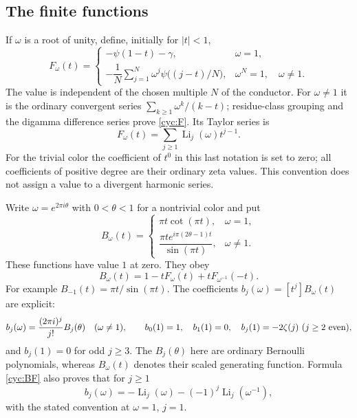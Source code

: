 \documentclass[11pt,a4paper]{article}
\numberwithin{equation}{section}
\theoremstyle{definition}
\theoremstyle{remark}
\begin{document}
\subsection{The finite functions}

If $\omega$ is a root of unity, define, initially for $|t|<1$,
\begin{equation}\label{cyc:F}
 F_\omega(t)=\begin{cases}
 -\psi(1-t)-\gamma,&\omega=1,\\[2pt]
 -\dfrac1N\displaystyle\sum_{j=1}^N\omega^j
                  \psi\bigl((j-t)/N\bigr),
       &\omega^N=1,\quad\omega\ne1.
 \end{cases}
\end{equation}
The value is independent of the chosen multiple $N$ of the conductor.
For $\omega\ne1$ it is the ordinary convergent series
$\sum_{k\ge1}\omega^k/(k-t)$; residue-class grouping and the digamma
difference series prove \eqref{cyc:F}.  Its Taylor series is
\[
 F_\omega(t)=\sum_{j\ge1}\operatorname{Li}_j(\omega)t^{j-1}.
\]
For the trivial color the coefficient of $t^0$ in this last notation is
set to zero; all coefficients of positive degree are their ordinary
zeta values.  This convention does not assign a value to a divergent
harmonic series.

Write $\omega=e^{2\pi i\theta}$ with $0<\theta<1$ for a nontrivial
color and put
\begin{equation}\label{cyc:B}
 B_\omega(t)=\begin{cases}
 \pi t\cot(\pi t),&\omega=1,\\[2pt]
 \dfrac{\pi t e^{i\pi(2\theta-1)t}}{\sin(\pi t)},&\omega\ne1.
 \end{cases}
\end{equation}
These functions have value $1$ at zero.  They obey
\begin{equation}\label{cyc:BF}
 B_\omega(t)=1-tF_\omega(t)+tF_{\omega^{-1}}(-t).
\end{equation}
For example $B_{-1}(t)=\pi t/\sin(\pi t)$.
The coefficients $b_j(\omega)=[t^j]B_\omega(t)$ are explicit:
\[
 b_j(\omega)=\frac{(2\pi i)^j}{j!}B_j(\theta)\quad(\omega\ne1),
 \qquad b_0(1)=1,\quad b_1(1)=0,
 \quad b_j(1)=-2\zeta(j)\ (j\ge2\hbox{ even}),
\]
and $b_j(1)=0$ for odd $j\ge3$.  The $B_j(\theta)$ here are ordinary
Bernoulli polynomials, whereas $B_\omega(t)$ denotes their scaled
generating function.  Formula \eqref{cyc:BF} also proves that for $j\ge1$
\[
 b_j(\omega)=-\operatorname{Li}_j(\omega)
                    -(-1)^j\operatorname{Li}_j(\omega^{-1}),
\]
with the stated convention at $\omega=1$, $j=1$.
\end{document}
